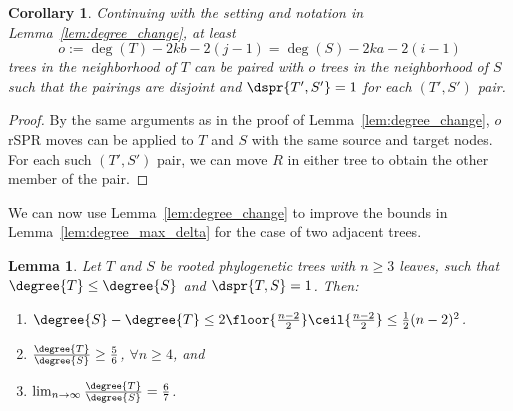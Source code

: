 \documentclass[11pt,onecolumn,conference]{IEEEtran}
\newtheorem{lemma}[theorem]{Lemma}
\newtheorem{corollary}[theorem]{Corollary}
\begin{document}
\begin{corollary}
\label{cor:paired_neighbors}
Continuing with the setting and notation in Lemma~\ref{lem:degree_change}, at least
$$o := \deg(T) - 2kb - 2(j-1) = \deg(S) - 2ka - 2(i-1)$$
trees in the neighborhood of $T$ can be paired with $o$ trees in the neighborhood of $S$ such that the pairings are disjoint and $\dspr{T',S'} = 1$ for each $(T',S')$ pair.
\end{corollary}
\begin{proof}
By the same arguments as in the proof of Lemma~\ref{lem:degree_change}, $o$ rSPR moves can be applied to $T$ and $S$ with the same source and target nodes.
For each such $(T',S')$ pair, we can move $R$ in either tree to obtain the other member of the pair.
\end{proof}

We can now use Lemma~\ref{lem:degree_change} to improve the bounds in Lemma~\ref{lem:degree_max_delta} for the case of two adjacent trees.
\begin{lemma}
	\label{lem:degree_max_delta_adjacent}
	Let $T$ and $S$ be rooted phylogenetic trees with $n \ge 3$ leaves, such that $\degree{T} \le \degree{S}$ and $\dspr{T,S} = 1$.
	Then:
	\begin{enumerate}
		\item $\degree{S} - \degree{T} \le 2\floor{\frac{n-2}{2}}\ceil{\frac{n-2}{2}} \le \frac{1}{2} (n-2)^2 $.
		\item $\frac{\degree{T}}{\degree{S}} \ge \frac{5}{6}$, $\forall n \ge 4$, and
		\item $\lim_{n\rightarrow\infty}\frac{\degree{T}}{\degree{S}} =  \frac{6}{7}$.
	\end{enumerate}
\end{lemma}
\end{document}

